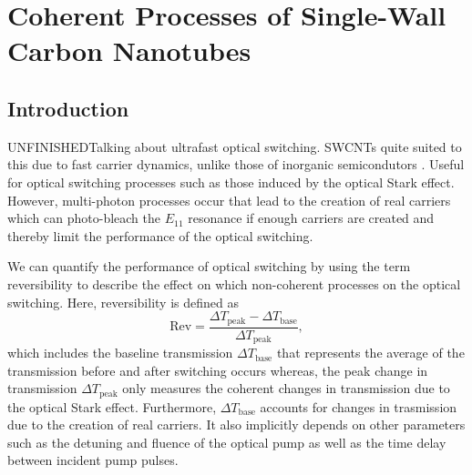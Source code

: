 \chapter{Coherent Processes of Single-Wall Carbon Nanotubes}

\section{Introduction}


{\color{red} UNFINISHED}Talking about ultrafast optical switching. SWCNTs quite suited to this due to fast carrier dynamics, unlike those of inorganic semicondutors \cite{maeda2006gigantic}. Useful for optical switching processes such as those induced by the optical Stark effect. However, multi-photon processes occur that lead to the creation of real carriers which can photo-bleach the $E_{11}$ resonance if enough carriers are created and thereby limit the performance of the optical switching.

We can quantify the performance of optical switching by using the term reversibility to describe the effect on which non-coherent processes on the optical switching. Here, reversibility is defined as
%
\begin{equation}
 	\text{Rev} = \dfrac{\Delta T_\text{peak} - \Delta T_\text{base}}{\Delta T_\text{peak}},
  \label{eq:kira_reversibility}
\end{equation}
%
which includes the baseline transmission $\Delta T_\text{base}$ that represents the average of the transmission before and after switching occurs whereas, the peak change in transmission $\Delta T_\text{peak}$ only measures the coherent changes in transmission due to the optical Stark effect. Furthermore, $\Delta T_\text{base}$ accounts for changes in trasmission due to the creation of real carriers. It also implicitly depends on other parameters such as the detuning and fluence of the optical pump as well as the time delay between incident pump pulses.

